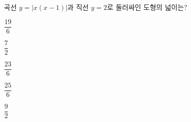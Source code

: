 곡선 $y=|x(x-1)|$과 직선 $y=2$로 둘러싸인 도형의 넓이는?
\begin{choices32}{\rule[-3ex]{0pt}{8ex}$\dfrac{19}{6}$}{\rule[-3ex]{0pt}{8ex}$\dfrac{7}{2}$}{\rule[-3ex]{0pt}{8ex}$\dfrac{23}{6}$}{\rule[-3ex]{0pt}{8ex}$\dfrac{25}{6}$}{\rule[-3ex]{0pt}{8ex}$\dfrac{9}{2}$}\end{choices32}
